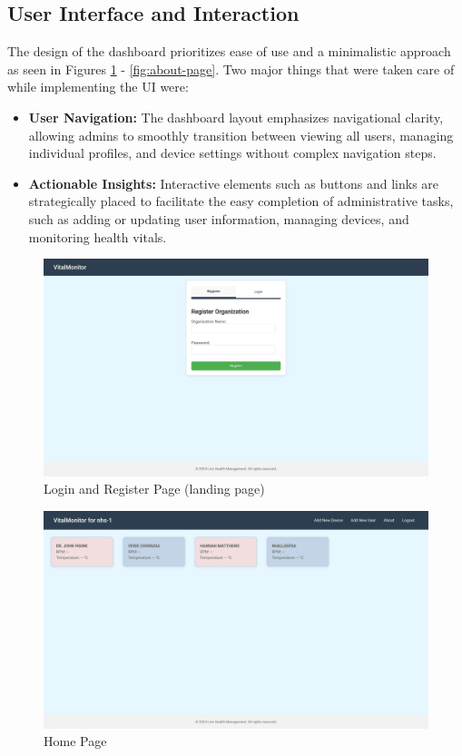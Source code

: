 \subsection{User Interface and Interaction}
The design of the dashboard prioritizes ease of use and a minimalistic approach as seen in Figures \ref{fig:login-page} - \ref{fig:about-page}. Two major things that were taken care of while implementing the UI were:

\begin{itemize}

    \item \textbf{User Navigation:}
     The dashboard layout emphasizes navigational clarity, allowing admins to smoothly transition between viewing all users, managing individual profiles, and device settings without complex navigation steps.
    
    \item \textbf{Actionable Insights:}
     Interactive elements such as buttons and links are strategically placed to facilitate the easy completion of administrative tasks, such as adding or updating user information, managing devices, and monitoring health vitals.

\end{itemize}

\begin{figure}[h!]
    \centering
    \includegraphics[width=1\linewidth]{images/dashboard-6.jpeg}
    \caption{Login and Register Page (landing page)}
    \label{fig:login-page}
\end{figure}

\begin{figure}[h!]
    \centering
    \includegraphics[width=1\linewidth]{images/dashboard-5.jpeg}
    \caption{Home Page}
    \label{fig:home-page}
\end{figure}

